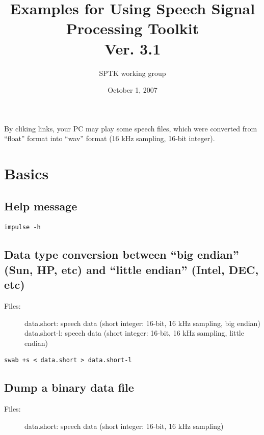 \documentclass[a4paper]{article}
\title{
  Examples for Using Speech Signal Processing Toolkit\\
  Ver. 3.1}
\author{SPTK working group}
\date{October 1, 2007}
\begin{document}
\maketitle

\begin{htmlonly}
  By cliking links, your PC may play some speech files, which
  were converted from ``float'' format into ``wav'' format
  (16 kHz sampling, 16-bit integer).
\end{htmlonly}

\tableofcontents

\section{Basics}

\subsection{Help message}

\begin{verbatim}
impulse -h
\end{verbatim}

\subsection{Data type conversion between ``big endian'' (Sun, HP, etc) and
  ``little endian'' (Intel, DEC, etc)}

\begin{description}
\item[Files:]
  data.short: speech data (short integer: 16-bit, 16 kHz sampling, big endian)\\
  data.short-l: speech data (short integer: 16-bit, 16 kHz sampling, little endian)
\end{description}

\begin{verbatim}
swab +s < data.short > data.short-l
\end{verbatim}

\subsection{Dump a binary data file}

\begin{description}
\item[Files:]
  data.short: speech data (short integer: 16-bit, 16 kHz sampling)
\end{description}
\end{document}
